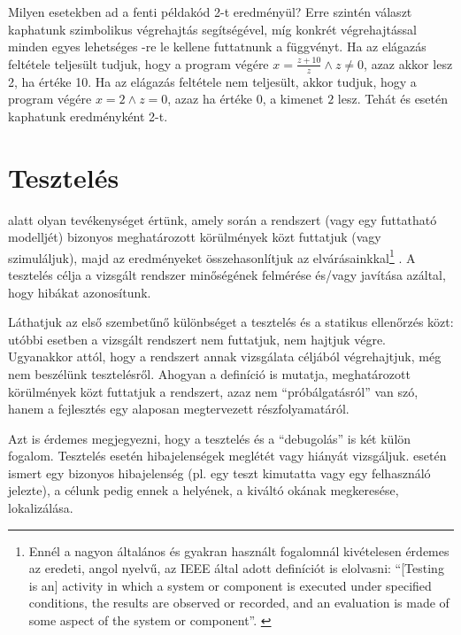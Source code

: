\begin{pelda}
Milyen esetekben ad a fenti példakód 2-t eredményül? Erre szintén választ kaphatunk szimbolikus végrehajtás segítségével, míg konkrét végrehajtással minden egyes lehetséges -re le kellene futtatnunk a függvényt. Ha az elágazás feltétele teljesült tudjuk, hogy a program végére $x = \frac{z+10}{z} \wedge z \neq 0$, azaz  akkor lesz 2, ha  értéke 10. Ha az elágazás feltétele nem teljesült, akkor tudjuk, hogy a program végére $x = 2 \wedge z = 0$, azaz ha  értéke 0, a kimenet $2$ lesz. Tehát  és  esetén kaphatunk eredményként 2-t.
\end{pelda}




\section{Tesztelés}\label{sec:teszteles}

 alatt olyan tevékenységet értünk, amely során a rendszert (vagy egy futtatható modelljét) bizonyos meghatározott körülmények közt futtatjuk (vagy szimuláljuk), majd az eredményeket összehasonlítjuk az elvárásainkkal\footnote{Ennél a nagyon általános és gyakran használt fogalomnál kivételesen érdemes az eredeti, angol nyelvű, az IEEE által adott definíciót is elolvasni: ``[Testing is an] activity in which a system or component is executed under specified conditions, the results are observed or recorded, and an evaluation is made of some aspect of the system or component''. \cite{IEEE-24765}} \cite{IEEE-24765}. A tesztelés célja a vizsgált rendszer minőségének felmérése és/vagy javítása azáltal, hogy hibákat azonosítunk. 

Láthatjuk az első szembetűnő különbséget a tesztelés és a statikus ellenőrzés közt: utóbbi esetben a vizsgált rendszert nem futtatjuk, nem hajtjuk végre. Ugyanakkor attól, hogy a rendszert annak vizsgálata céljából végrehajtjuk, még nem beszélünk tesztelésről. Ahogyan a definíció is mutatja, meghatározott körülmények közt futtatjuk a rendszert, azaz nem ``próbálgatásról'' van szó, hanem a fejlesztés egy alaposan megtervezett részfolyamatáról.

Azt is érdemes megjegyezni, hogy a tesztelés és a ``debugolás'' is két külön fogalom. Tesztelés esetén hibajelenségek meglétét vagy hiányát vizsgáljuk.  esetén ismert egy bizonyos hibajelenség (pl. egy teszt kimutatta vagy egy felhasználó jelezte), a célunk pedig ennek a helyének, a kiváltó okának megkeresése, lokalizálása.


